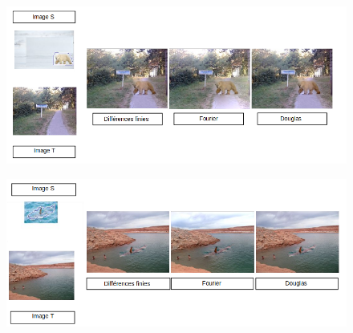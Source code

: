 \begin{figure}[!h]
\centering
\includegraphics[scale=0.5]{Images/Resultats/4.png}
\end{figure}
\begin{figure}[!h]
\centering
\includegraphics[scale=0.5]{Images/Resultats/5.png}
\end{figure}

